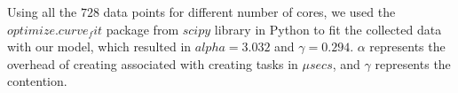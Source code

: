 Using all the $728$ data points for different number of cores, we used the $optimize.curve_fit$ package from $scipy$ library in Python to fit the collected data with our model, which resulted in $alpha=3.032$ and $\gamma=0.294$. $\alpha$ represents the overhead of creating associated with creating tasks in $\mu{secs}$, and $\gamma$ represents the contention.

\begin{figure}[H]
	\centering
	\hfill
\end{figure}
